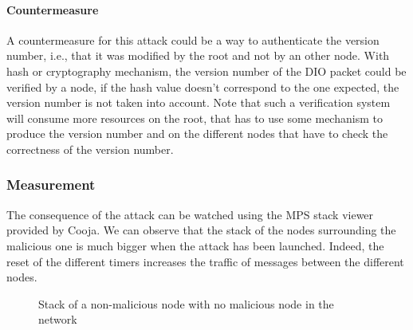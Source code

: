 \documentclass{report}
\begin{document}
\paragraph{Countermeasure}
A countermeasure for this attack could be a way to authenticate the
version number, i.e., that it was modified by the root and not by an
other node. With hash or cryptography mechanism, the version number of
the \textsc{DIO} packet could be verified by a node, if the hash value doesn't
correspond to the one expected, the version number is not taken into
account. Note that such a verification system will consume more
resources on the root, that has to use some mechanism to produce the
version number and on the different nodes that have to check the
correctness of the version number.

\subsubsection{Measurement}
The consequence of the attack can be watched using the MPS stack viewer
provided by Cooja. We can observe that the stack of the nodes
surrounding the malicious one is much bigger when the attack has been
launched. Indeed, the reset of the different timers increases the
traffic of messages between the different nodes.


\begin{figure}

    \caption{Stack of a non-malicious node with no malicious node in the network}
\label{fig:vna1}
\end{figure}
\end{document}
